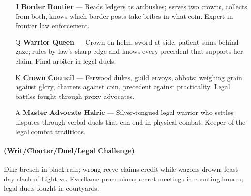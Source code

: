 \begin{enumerate}
\item[J] \textbf{Border Routier} --- Reads ledgers as ambushes; serves two crowns, collects from both, knows which border posts take bribes in what coin. Expert in frontier law enforcement.
\item[Q] \textbf{Warrior Queen} --- Crown on helm, sword at side, patient sums behind gaze; rules by law's sharp edge and knows every precedent that supports her claim. Final arbiter in legal duels.
\item[K] \textbf{Crown Council} --- Fenwood dukes, guild envoys, abbots; weighing grain against glory, charters against coin, precedent against practicality. Legal battles fought through proxy advocates.
\item[A] \textbf{Master Advocate Halric} --- Silver-tongued legal warrior who settles disputes through verbal duels that can end in physical combat. Keeper of the legal combat traditions.
\end{enumerate}

\paragraph*{(Writ/Charter/Duel/Legal Challenge)} Dike breach in black-rain; wrong reeve claims credit while wagons drown; feast-day clash of Light vs. Everflame processions; secret meetings in counting houses; legal duels fought in courtyards.


